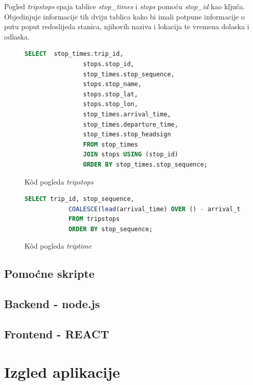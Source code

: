 \documentclass[zavrsnirad]{fer}
\begin{document}
Pogled \textit{tripstops} spaja tablice \textit{stop\_times} i \textit{stops} pomoću \textit{stop\_id} kao ključa. Objedinjuje informacije tih dviju tablica kako bi imali potpune informacije o putu poput redoslijeda stanica, njihovih naziva i lokacija te vremena dolaska i odlaska.
\begin{figure}[h]
	\centering
	\begin{minipage}{0.8\linewidth}
		\begin{lstlisting}[language=SQL]
 		SELECT  stop_times.trip_id,
				stops.stop_id,
				stop_times.stop_sequence,
				stops.stop_name,
				stops.stop_lat,
				stops.stop_lon,
				stop_times.arrival_time,
				stop_times.departure_time,
				stop_times.stop_headsign
				FROM stop_times
				JOIN stops USING (stop_id)
				ORDER BY stop_times.stop_sequence;
		\end{lstlisting}
	\end{minipage}
	\caption{K\^od pogleda \textit{tripstops}}
	\label{slk:tripstops}
\end{figure}

\begin{figure}[h]
	\centering
	\begin{minipage}{0.8\linewidth}
		\begin{lstlisting}[language=SQL]
			SELECT trip_id, stop_sequence,
			COALESCE(lead(arrival_time) OVER () - arrival_time, '00:00:00'::interval) AS time_till_next_stop
			FROM tripstops
			ORDER BY stop_sequence;
		\end{lstlisting}
	\end{minipage}
	\caption{K\^od pogleda \textit{triptime}}
	\label{slk:triptime}
\end{figure}

\subsection{Pomoćne skripte}
\label{sec:skripta}

\subsection{Backend - node.js}

\subsection{Frontend - REACT}
\label{sec:frontend}

\section{Izgled aplikacije}
\end{document}

